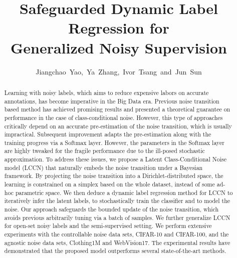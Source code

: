 \documentclass[journal]{IEEEtran}
\begin{document}
\title{Safeguarded Dynamic Label Regression for \\Generalized Noisy Supervision}


\author{Jiangchao~Yao,~Ya~Zhang,~Ivor~Tsang~and~Jun~Sun}



















\maketitle

\begin{abstract}
Learning with noisy labels, which aims to reduce expensive labors on accurate annotations, has become imperative in the Big Data era. Previous noise transition based method has achieved promising results and presented a theoretical guarantee on performance in the case of class-conditional noise. However, this type of approaches critically depend on an accurate pre-estimation of the noise transition, which is usually impractical. Subsequent improvement adapts the pre-estimation along with the training progress via a Softmax layer. However, the parameters in the Softmax layer are highly tweaked for the fragile performance due to the ill-posed stochastic approximation. To address these issues, we propose a Latent Class-Conditional Noise model (LCCN) that naturally embeds the noise transition under a Bayesian framework. By projecting the noise transition into a Dirichlet-distributed space, the learning is constrained on a simplex based on the whole dataset, instead of some ad-hoc parametric space. We then deduce a dynamic label regression method for LCCN to iteratively infer the latent labels, to stochastically train the classifier and to model the noise. Our approach safeguards the bounded update of the noise transition, which avoids previous arbitrarily tuning via a batch of samples. We further generalize LCCN for open-set noisy labels and the semi-supervised setting. We perform extensive experiments with the controllable noise data sets, CIFAR-10 and CIFAR-100, and the agnostic noise data sets, Clothing1M and WebVision17. The experimental results have demonstrated that the proposed model outperforms several state-of-the-art methods.
\end{abstract}
\end{document}
